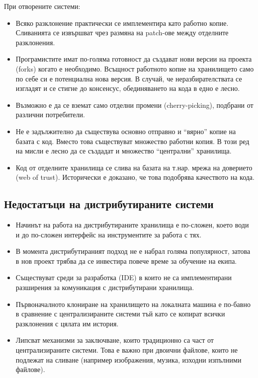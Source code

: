 \documentclass[a4paper]{article}
\begin{document}
      При отворените системи:
      \begin{itemize}
        \item Всяко разклонение практически се имплементира като работно копие. Сливанията се извършват чрез размяна на patch-ове между отделните разклонения.
        \item Програмистите имат по-голяма готовност да създават нови версии на проекта (forks) когато е необходимо. Всъщност работното копие на хранилището само по себе си е потенциална нова версия. В случай, че неразбирателствата се изгладят и се стигне до консенсус, обединяването на кода в едно е лесно.
        \item Възможно е да се вземат само отделни промени (cherry-picking), подбрани от различни потребители.
        \item Не е задължително да съществува основно отправно и ``вярно'' копие на базата с код. Вместо това съществуват множество работни копия. В този ред на мисли е лесно да се създадат и множество ``централни'' хранилища.
        \item Код от отделните хранилища се слива на базата на т.нар. мрежа на доверието (web of trust). Исторически е доказано, че това подобрява качеството на кода.
      \end{itemize}

  \subsection{Недостатъци на дистрибутираните системи}
    \begin{itemize}
      \item Начинът на работа на дистрибутираните хранилища е по-сложен, което
      води и до по-сложен интерфейс на инструментите за работа с тях.
      \item В момента дистрибутираният подход не е набрал голяма популярност,
      затова в нов проект трябва да се инвестира повече време за обучение на
      екипа.
      \item Съществуват среди за разработка (IDE) в които не са
      имплементирани разширения за комуникация с дистрибутирани хранилища.
      \item Първоначалното клониране на хранилището на локалната машина
      е по-бавно в сравнение с централизираните системи тъй като се копират
      всички разклонения с цялата им история.
      \item Липсват механизми за заключване, които традиционно са част от
      централизираните системи. Това е важно при двоични файлове, които не
      подлежат на сливане (например изображения, музика, изходни изпълними
      файлове).
    \end{itemize}
\end{document}
